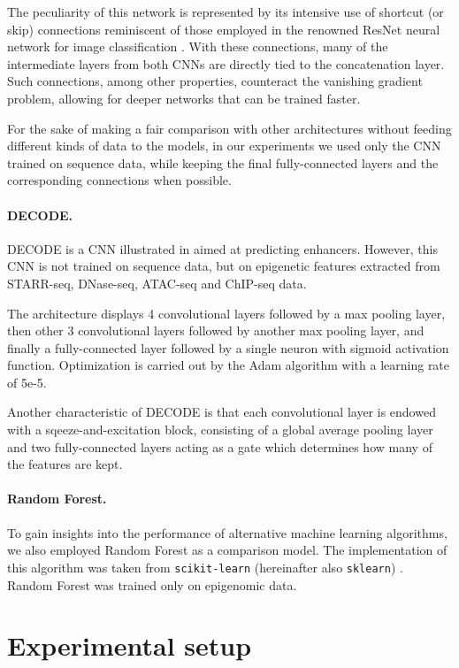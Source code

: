 \documentclass{article}
\begin{document}
The peculiarity of this network is represented by its intensive use of shortcut (or skip) connections reminiscent of those employed in the renowned ResNet neural network for image classification \cite{he15resnet}. With these connections, many of the intermediate layers from both CNNs are directly tied to the concatenation layer. Such connections, among other properties, counteract the vanishing gradient problem, allowing for deeper networks that can be trained faster.

For the sake of making a fair comparison with other architectures without feeding different kinds of data to the models, in our experiments we used only the CNN trained on sequence data, while keeping the final fully-connected layers and the corresponding connections when possible.

\paragraph{DECODE.} DECODE is a CNN illustrated in \cite{chen_zhang21} aimed at predicting enhancers. However, this CNN is not trained on sequence data, but on epigenetic features extracted from STARR-seq, DNase-seq, ATAC-seq and ChIP-seq data.

The architecture displays 4 convolutional layers followed by a max pooling layer, then other 3 convolutional layers followed by another max pooling layer, and finally a fully-connected layer followed by a single neuron with sigmoid activation function. Optimization is carried out by the Adam algorithm with a learning rate of 5e-5.

Another characteristic of DECODE is that each convolutional layer is endowed with a sqeeze-and-excitation block, consisting of a global average pooling layer and two fully-connected layers acting as a gate which determines how many of the features are kept.

\paragraph{Random Forest.} To gain insights into the performance of alternative machine learning algorithms, we also employed Random Forest \cite{leo01rf} as a comparison model. The implementation of this algorithm was taken from \texttt{scikit-learn} (hereinafter also \texttt{sklearn}) \cite{scikit-learn}. Random Forest was trained only on epigenomic data.

\section{Experimental setup}
\label{sec:experimental_setup}
\end{document}
